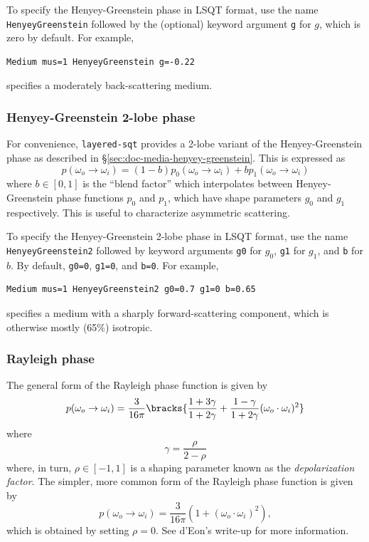 \documentclass[
    twoside,
    twocolumn,
    letterpaper,
    10pt]{article}
\newcommand\namett[2]{{\color{code#1}\texttt{#2}}}
\begin{document}
To specify the Henyey-Greenstein phase in LSQT format, use the name
\namett{purple}{HenyeyGreenstein} followed by the (optional) keyword 
argument \texttt{g} for $g$, which is zero by default. For example,
\begin{lstlisting}
Medium mus=1 HenyeyGreenstein g=-0.22
\end{lstlisting}
specifies a moderately back-scattering medium.

\subsubsection{Henyey-Greenstein 2-lobe phase}
\label{sec:doc-media-henyey-greenstein2}

For convenience, \texttt{layered-sqt} provides a 2-lobe variant
of the Henyey-Greenstein phase as described in 
\S\ref{sec:doc-media-henyey-greenstein}. This is expressed as
\begin{equation*}
    p(\omega_o\to\omega_i) = 
    (1 - b) p_0(\omega_o\to\omega_i) +
         b  p_1(\omega_o\to\omega_i)
\end{equation*}
where $b \in [0, 1]$ is the ``blend factor'' which interpolates between
Henyey-Greenstein phase functions $p_0$ and $p_1$, which have shape
parameters $g_0$ and $g_1$ respectively. This is useful to characterize
asymmetric scattering.

To specify the Henyey-Greenstein 2-lobe phase in LSQT 
format, use the name 
\namett{purple}{HenyeyGreenstein2} followed by keyword arguments 
\texttt{g0} for $g_0$, \texttt{g1} for $g_1$, and \texttt{b} for
$b$. By default, \texttt{g0=0}, \texttt{g1=0}, and \texttt{b=0}.
For example,
\begin{lstlisting}
Medium mus=1 HenyeyGreenstein2 g0=0.7 g1=0 b=0.65
\end{lstlisting}
specifies a medium with a sharply forward-scattering component, which
is otherwise mostly (65\%) isotropic.

\subsubsection{Rayleigh phase}
\label{sec:doc-media-rayleigh}

The general form of the Rayleigh phase function is given by
\begin{equation*}
    p(\omega_o\to\omega_i) = 
    \frac{3}{16\pi}
    \bracks{
        \frac{1 + 3\gamma}{1 + 2\gamma} +
        \frac{1 -  \gamma}{1 + 2\gamma} (\omega_o\cdot\omega_i)^2}
\end{equation*}
where
\begin{equation*}
    \gamma = \frac{\rho}{2 - \rho}
\end{equation*}
where, in turn, $\rho \in [-1, 1]$ is a shaping parameter known as 
the \emph{depolarization factor}. The simpler, more common form of the
Rayleigh phase function is given by
\begin{equation*}
    p(\omega_o\to\omega_i) = \frac{3}{16\pi}(1 + (\omega_o\cdot\omega_i)^2),
\end{equation*}
which is obtained by setting $\rho = 0$. See d'Eon's write-up
\cite[p.~19]{dEon:16} for more information.
\end{document}
